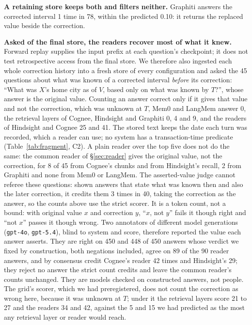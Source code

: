 \documentclass[conference]{IEEEtran}
\begin{document}
\textbf{A retaining store keeps both and filters neither.} Graphiti answers the
corrected interval 1 time in 78, within the predicted 0.10: it returns the
replaced value beside the correction.

\textbf{Asked of the final store, the readers recover most of what it knew.} Forward replay supplies the input prefix at each question's checkpoint;
it does not test retrospective access from the final store. We therefore also ingested each whole correction
history into a fresh store of every configuration and asked the 45 questions
about what was known of a corrected interval \emph{before} its correction:
``What was $X$'s home city as of $V$, based only on what was known by $T$?'',
whose answer is the original value. Counting an answer correct only if it gives
that value and not the correction, which was unknown at $T$, Mem0 and LangMem
answer 0, the retrieval layers of Cognee, Hindsight and Graphiti 0, 4 and 9,
and the readers of Hindsight and Cognee 25 and 41. The stored text keeps the
date each turn was recorded, which a reader can use; no system has a
transaction-time predicate (Table~\ref{tab:fragment},
C2). A plain reader over the top five does not do the same: the common reader of
\S\ref{sec:reader} gives the original value, not the correction, for 8 of 45 from
Cognee's chunks and from Hindsight's recall, 2 from Graphiti and none from Mem0
or LangMem. The asserted-value judge cannot referee these questions: shown
answers that state what was known then and also the later correction, it
credits them 3 times in 40, taking the correction as the answer, so the counts
above use the strict scorer. It is a token count, not a bound: with original
value $x$ and correction $y$, ``$x$, not $y$'' fails it though right and
``not $x$'' passes it though wrong. Two annotators of different model
generations (\texttt{gpt-4o}, \texttt{gpt-5.4}), blind to system and score,
therefore reported the value each answer asserts. They are right on 450 and 448
of 450 answers whose verdict we fixed by construction, both negations included,
agree on 89 of the 90 reader answers, and by consensus credit Cognee's reader 42
times and Hindsight's 29; they reject no answer the strict count credits and
leave the common reader's counts unchanged. They are models checked on
constructed answers, not people. The grid's scorer, which we had
preregistered, does not count the correction as wrong here, because it was
unknown at $T$; under it the retrieval layers score 21 to 27 and the readers 34
and 42, against the 5 and 15 we had predicted as the most any retrieval layer or
reader would reach.
\end{document}
